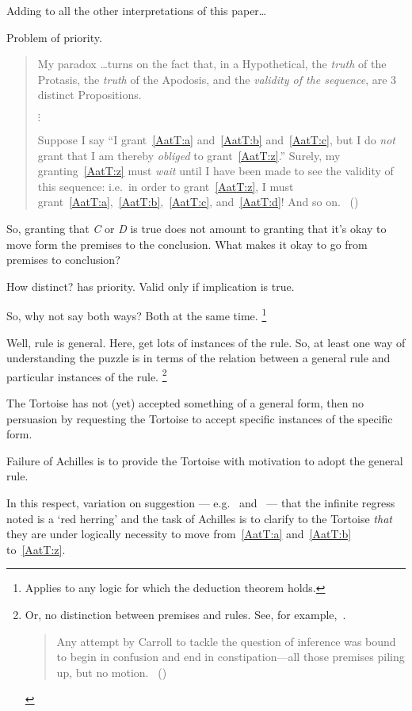 \begin{note}
  \color{red}
  Adding to all the other interpretations of this paper\dots
\end{note}


\begin{note}
  Problem of priority.
  \begin{quote}
    My paradox \dots turns on the fact that, in a Hypothetical, the \emph{truth} of the Protasis, the \emph{truth} of the Apodosis, and the \emph{validity of the sequence}, are 3 distinct Propositions.

    \mbox{}\hfill\(\vdots\)\hfill\mbox{}

    Suppose I say ``I grant~\ref{AatT:a} and~\ref{AatT:b} and~\ref{AatT:c}, but I do \emph{not} grant that I am thereby \emph{obliged} to grant~\ref{AatT:z}.''
    Surely, my granting~\ref{AatT:z} must \emph{wait} until I have been made to see the validity of this sequence: i.e.\ in order to grant~\ref{AatT:z}, I must grant~\ref{AatT:a},~\ref{AatT:b},~\ref{AatT:c}, and~\ref{AatT:d}! And so on.%
    \mbox{ }\hfill\mbox{(\citeyear[472]{Carroll:1977wl})}
  \end{quote}

  So, granting that \emph{C} or \emph{D} is true does not amount to granting that it's okay to move form the premises to the conclusion.
  What makes it okay to go from premises to conclusion?

  How distinct?
  \citeauthor{Carroll:1977wl} has priority.
  Valid only if implication is true.

  So, why not say both ways?
  Both at the same time.%
  \footnote{
    Applies to any logic for which the deduction theorem holds.
  }

  Well, rule is general.
  Here, get lots of instances of the rule.
  So, at least one way of understanding the puzzle is in terms of the relation between a general rule and particular instances of the rule.%
  \footnote{
    Or, no distinction between premises and rules.
    See, for example,~\textcite{Smiley:1995wk}.
    \begin{quote}
      Any attempt by Carroll to tackle the question of inference was bound to begin in confusion and end in constipation---all those premises piling up, but no motion.\newline
      \mbox{ }\hfill\mbox{(\citeyear[727]{Smiley:1995wk})}
    \end{quote}
  }

  The Tortoise has not (yet) accepted something of a general form, then no persuasion by requesting the Tortoise to accept specific instances of the specific form.

  Failure of Achilles is to provide the Tortoise with motivation to adopt the general rule.

  In this respect, variation on suggestion --- e.g.\ \textcite[21--22,33]{Thomson:2010tt} and~\textcite[573]{Wisdom:1974uc} ---  that the infinite regress \citeauthor{Carroll:1895uj} noted is a `red herring' and the task of Achilles is to clarify to the Tortoise \emph{that} they are under logically necessity to move from~\ref{AatT:a} and~\ref{AatT:b} to~\ref{AatT:z}.
\end{note}

